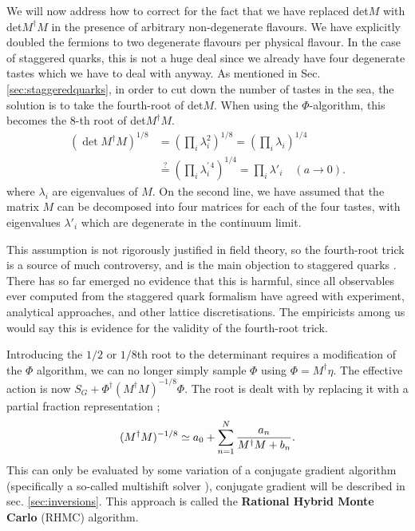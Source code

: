 We will now address how to correct for the fact that we have replaced det$M$ with det$M^{\dagger}M$ in the presence of arbitrary non-degenerate flavours. We have explicitly doubled the fermions to two degenerate flavours per physical flavour. In the case of staggered quarks, this is not a huge deal since we already have four degenerate tastes which we have to deal with anyway. As mentioned in Sec. \ref{sec:staggeredquarks}, in order to cut down the number of tastes in the sea, the solution is to take the fourth-root of det$M$. When using the $\Phi$-algorithm, this becomes the 8-th root of det$M^{\dagger}M$.
\begin{align}
  (\det M^{\dagger} M )^{1/8} &= (\prod_i \lambda_i^2)^{1/8} = (\prod_i \lambda_i)^{1/4} \\ \nonumber &\stackrel{?}{=} (\prod_i\lambda_i^{'\,4})^{1/4} = \prod_i \lambda'_i \quad (a\to 0).
\end{align}
where $\lambda_i$ are eigenvalues of $M$. On the second line, we have assumed that the matrix $M$ can be decomposed into four matrices for each of the four tastes, with eigenvalues $\lambda'_i$ which are degenerate in the continuum limit.

This assumption is not rigorously justified in field theory, so the fourth-root trick is a source of much controversy, and is the main objection to staggered quarks \cite{JANSEN20043,CREUTZ2007230,Creutz:2007rk}. There has so far emerged no evidence that this is harmful, since all observables ever computed from the staggered quark formalism have agreed with experiment, analytical approaches, and other lattice discretisations. The empiricists among us would say this is evidence for the validity of the fourth-root trick.

Introducing the $1/2$ or $1/8$th root to the determinant requires a modification of the $\Phi$ algorithm, we can no longer simply sample $\Phi$ using $\Phi=M^{\dagger}\eta$. The effective action is now $S_G + \Phi^{\dagger} (M^{\dagger}M)^{-1/8} \Phi$. The root is dealt with by replacing it with a partial fraction representation \cite{Clark:2006fx};
\begin{align}
  (M^{\dagger}M)^{-1/8} \simeq a_0 + \sum_{n=1}^N { a_n \over M^{\dagger}M + b_n }.
  \label{eq:rational}
\end{align}
This can only be evaluated by some variation of a conjugate gradient algorithm (specifically a so-called multishift solver \cite{Frommer:1995ik,Jegerlehner:1996pm}), conjugate gradient will be described in sec. \ref{sec:inversions}. This approach is called the {\bf{Rational Hybrid Monte Carlo}} (RHMC) algorithm.

